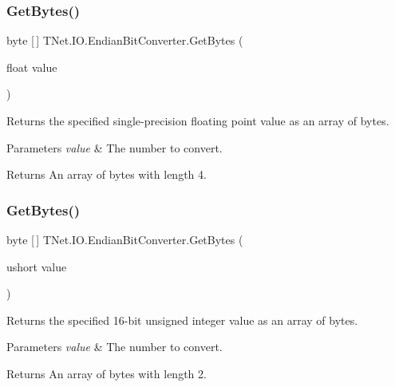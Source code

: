 \subsubsection{\texorpdfstring{Get\+Bytes()}{GetBytes()}\hspace{0.1cm}{\footnotesize\ttfamily [8/11]}}
{\footnotesize\ttfamily byte \mbox{[}$\,$\mbox{]} T\+Net.\+I\+O.\+Endian\+Bit\+Converter.\+Get\+Bytes (\begin{DoxyParamCaption}\item[{float}]{value }\end{DoxyParamCaption})}



Returns the specified single-\/precision floating point value as an array of bytes. 


\begin{DoxyParams}{Parameters}
{\em value} & The number to convert.\\
\hline
\end{DoxyParams}
\begin{DoxyReturn}{Returns}
An array of bytes with length 4.
\end{DoxyReturn}
\mbox{\label{class_t_net_1_1_i_o_1_1_endian_bit_converter_aeda4cf603ad487bb18ec95f947a1664b}} 
\subsubsection{\texorpdfstring{Get\+Bytes()}{GetBytes()}\hspace{0.1cm}{\footnotesize\ttfamily [9/11]}}
{\footnotesize\ttfamily byte \mbox{[}$\,$\mbox{]} T\+Net.\+I\+O.\+Endian\+Bit\+Converter.\+Get\+Bytes (\begin{DoxyParamCaption}\item[{ushort}]{value }\end{DoxyParamCaption})}



Returns the specified 16-\/bit unsigned integer value as an array of bytes. 


\begin{DoxyParams}{Parameters}
{\em value} & The number to convert.\\
\hline
\end{DoxyParams}
\begin{DoxyReturn}{Returns}
An array of bytes with length 2.
\end{DoxyReturn}
\mbox{\label{class_t_net_1_1_i_o_1_1_endian_bit_converter_a5a69ebad933ce89df339a41b7d1bf6c4}} 
